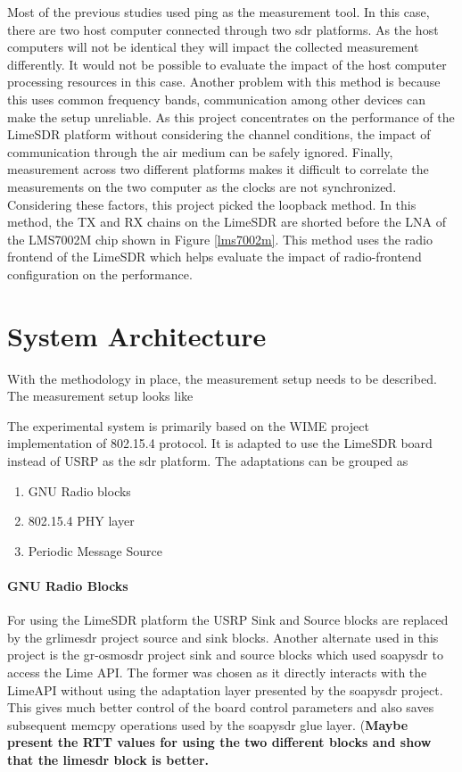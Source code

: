 Most of the previous studies used ping as the measurement tool.
In this case, there are two host computer connected through two \ac{sdr} platforms.
As the host computers will not be identical they will impact the collected measurement differently.
It would not be possible to evaluate the impact of the host computer processing resources in this case.
Another problem with this method is because this uses common frequency bands, communication among other devices can make the setup unreliable.
As this project concentrates on the performance of the LimeSDR platform without considering the channel conditions, the impact of communication through the air medium can be safely ignored.
Finally, measurement across two different platforms makes it difficult to correlate the measurements on the two computer as the clocks are not synchronized.
Considering these factors, this project picked the loopback method.
In this method, the TX and RX chains on the LimeSDR are shorted before the \ac{LNA} of the LMS7002M chip shown in Figure \ref{lms7002m}.
This method uses the radio frontend of the LimeSDR which helps evaluate the impact of radio-frontend configuration on the performance.




\section{System Architecture}
With the methodology in place, the measurement setup needs to be described.
The measurement setup looks like 

The experimental system is primarily based on the WIME project implementation of 802.15.4 protocol. It is adapted to use the LimeSDR board instead of USRP as the \ac{sdr} platform. The adaptations can be grouped as

\begin{enumerate}
\item{GNU Radio blocks}
\item{802.15.4 \ac{PHY} layer}
\item{Periodic Message Source}
\end{enumerate}

\paragraph{GNU Radio Blocks}

For using the LimeSDR platform the USRP Sink and Source blocks are replaced by the grlimesdr project source and sink blocks. Another alternate used in this project is the gr-osmosdr project sink and source blocks which used soapysdr to access the Lime API. The former was chosen as it directly interacts with the LimeAPI without using the adaptation layer presented by the soapysdr project. This gives much better control of the board control parameters and also saves subsequent memcpy operations used by the soapysdr glue layer. (\textbf{Maybe present the RTT values for using the two different blocks and show that the limesdr block is better.}

